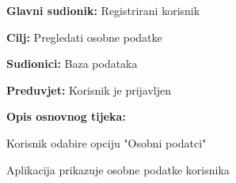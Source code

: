 					\noindent {}
					\begin{packed_item}
	
						\item \textbf{Glavni sudionik: } Registrirani korisnik
						\item  \textbf{Cilj:} Pregledati osobne podatke
						\item  \textbf{Sudionici:} Baza podataka
						\item  \textbf{Preduvjet:} Korisnik je prijavljen
						\item  \textbf{Opis osnovnog tijeka:}
						
						\item[] \begin{packed_enum}
	
							\item Korisnik odabire opciju "Osobni podatci"
							\item Aplikacija prikazuje osobne podatke korisnika

						\end{packed_enum}
						
						
					\end{packed_item}
					
